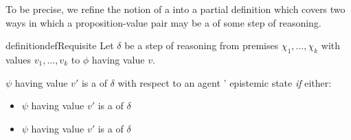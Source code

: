 \begin{note}
  To be precise, we refine the notion of a \requ{} into a partial definition which covers two ways in which a proposition-value pair may be a \requ{} of some step of reasoning.

  \begin{restatable}[A \requ{0}]{definition}{defRequisite}
    \label{def:requ}
    Let \(\delta\) be a step of reasoning from premises \(\chi_{1},\dots,\chi_{k}\) with values \(v_{1},\dots,v_{k}\) to \(\phi\) having value \(v\).

    \(\psi\) having value \(v'\) is a \emph{\requ{}} of \(\delta\) with respect to an agent \vAgent{}' epistemic state \emph{if} either:
    \begin{itemize}
    \item \(\psi\) having value \(v'\) is a \emph{\prequ{}} of \(\delta\)
    \item \(\psi\) having value \(v'\) is a \emph{\crequ{}} of \(\delta\)
    \end{itemize}


\end{restatable}
\end{note}
